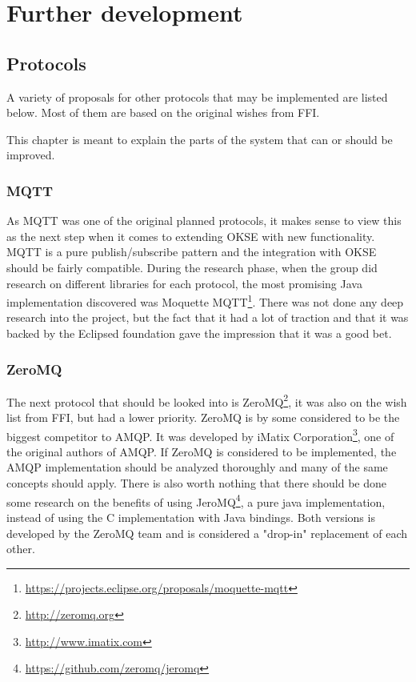 
\chapter{Further development}

\section{Protocols}
A variety of proposals for other protocols that may be implemented are listed below. Most of them are based on the original wishes from FFI.

This chapter is meant to explain the parts of the system that can or should be improved. 

\subsection{MQTT}
As MQTT was one of the original planned protocols, it makes sense to view this as the next step when it comes to extending OKSE with new functionality. MQTT is a pure publish/subscribe pattern and the integration with OKSE should be fairly compatible. 
During the research phase, when the group did research on different libraries for each protocol, the most promising Java implementation discovered was Moquette MQTT\footnote{\url{https://projects.eclipse.org/proposals/moquette-mqtt}}. There was not done any deep research into the project, but the fact that it had a lot of traction and that it was backed by the Eclipsed foundation gave the impression that it was a good bet.

\subsection{ZeroMQ}
The next protocol that should be looked into is ZeroMQ\footnote{\url{http://zeromq.org}}, it was also on the wish list from FFI, but had a lower priority. ZeroMQ is by some considered to be the biggest competitor to AMQP. It was developed by iMatix Corporation\footnote{\url{http://www.imatix.com}}, one of the original authors of AMQP. If ZeroMQ is considered to be implemented, the AMQP implementation should be analyzed thoroughly and many of the same concepts should apply. There is also worth nothing that there should be done some research on the benefits of using JeroMQ\footnote{\url{https://github.com/zeromq/jeromq}}, a pure java implementation, instead of using the C implementation with Java bindings. Both versions is developed by the ZeroMQ team and is considered a "drop-in" replacement of each other.
